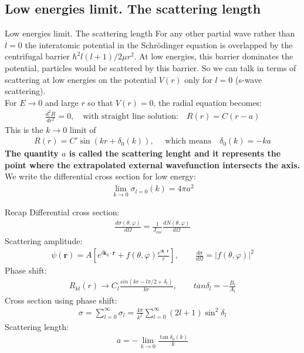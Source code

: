 \subsection{Low energies limit. The scattering length}
\begin{frame}{Low energies limit. The scattering length}
For any other partial wave rather than $l=0$ the interatomic potential in the Schr\"{o}dinger equation is overlapped by the centrifugal barrier $\hbar^2l(l+1)/2\mu r^2$. At low energies, this barrier dominates the potential, particles would be scattered by this barrier. So we can talk in terms of scattering at low energies on the potential $V(r)$ only for $l=0$ (s-wave scattering).\\
For $E\to0$ and large $r$ so that $V(r)=0$, the radial equation becomes:
\begin{align}
\frac{d^2R}{dr^2}=0, \quad \text {with straight line solution:}\quad R(r)=C(r-a)
\end{align}
This is the $k\to 0$ limit of 
\begin{align}
R(r)=C'\sin(kr+\delta_0(k)),\quad \text{ which means}\quad \delta_0(k)=-ka 
\end{align}
{\bf The quantity $a$ is called the scattering lenght and it represents the point where the extrapolated external wavefunction intersects the axis.}\\
We write the differential cross section for low energy:
\begin{align}
\lim_{k\to 0}\sigma_{l=0}(k)=4\pi a^2
\end{align}
\end{frame} 

\begin{frame}{Recap}
Differential cross section:
\begin{align}
\frac{d\sigma(\theta,\varphi)}{d\Omega}=\frac{1}{J_{inc}}\frac{dN(\theta,\varphi)}{d\Omega} 
\end{align}
Scattering amplitude:
\begin{align}
\psi({\bm r})=A \left[ e^{i{\bm k_0}\cdot{\bm r}}+f(\theta,\varphi)\frac{e^{i{\bm k}\cdot{\bm r}}}{r}\right],  \qquad  \boxed{\frac{d\sigma}{d\Omega}=|f(\theta,\varphi)|^2}
\end{align}
Phase shift:
\begin{align}
R_{kl}(r)\to C_l\frac{sin(kr-l\pi/2+\delta_l)}{kr}, \qquad  \boxed{tan\delta_l=-\frac{B_l}{A_l}}
\end{align}
Cross section using phase shift:
\begin{align}
\boxed{\sigma=\sum_{l=0}^{\infty}\sigma_l=\frac{4\pi}{k^2}\sum_{l=0}^{\infty}(2l+1)\sin^2\delta_l}
\end{align}
Scattering length:
\begin{align}
\boxed{a=-\lim_{k\to 0}\frac{\tan\delta_0(k)}{k}}
\end{align}
\end{frame}

